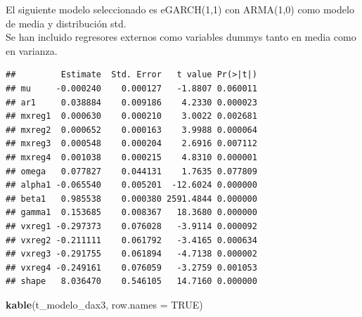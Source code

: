 \documentclass[
  11pt,
]{article}
\newenvironment{Shaded}{\begin{snugshade}}{\end{snugshade}}
\newcommand{\DataTypeTok}[1]{\textcolor[rgb]{0.13,0.29,0.53}{#1}}
\newcommand{\DecValTok}[1]{\textcolor[rgb]{0.00,0.00,0.81}{#1}}
\newcommand{\KeywordTok}[1]{\textcolor[rgb]{0.13,0.29,0.53}{\textbf{#1}}}
\newcommand{\NormalTok}[1]{#1}
\newcommand{\OperatorTok}[1]{\textcolor[rgb]{0.81,0.36,0.00}{\textbf{#1}}}
\newcommand{\OtherTok}[1]{\textcolor[rgb]{0.56,0.35,0.01}{#1}}
\newcommand{\StringTok}[1]{\textcolor[rgb]{0.31,0.60,0.02}{#1}}
\begin{document}
El siguiente modelo seleccionado es eGARCH(1,1) con ARMA(1,0) como
modelo de media y distribución std.\\
Se han incluido regresores externos como variables dummys tanto en media
como en varianza.

\begin{Shaded}
\end{Shaded}

\begin{verbatim}
##         Estimate  Std. Error   t value Pr(>|t|)
## mu     -0.000240    0.000127   -1.8807 0.060011
## ar1     0.038884    0.009186    4.2330 0.000023
## mxreg1  0.000630    0.000210    3.0022 0.002681
## mxreg2  0.000652    0.000163    3.9988 0.000064
## mxreg3  0.000548    0.000204    2.6916 0.007112
## mxreg4  0.001038    0.000215    4.8310 0.000001
## omega   0.077827    0.044131    1.7635 0.077809
## alpha1 -0.065540    0.005201  -12.6024 0.000000
## beta1   0.985538    0.000380 2591.4844 0.000000
## gamma1  0.153685    0.008367   18.3680 0.000000
## vxreg1 -0.297373    0.076028   -3.9114 0.000092
## vxreg2 -0.211111    0.061792   -3.4165 0.000634
## vxreg3 -0.291755    0.061894   -4.7138 0.000002
## vxreg4 -0.249161    0.076059   -3.2759 0.001053
## shape   8.036470    0.546105   14.7160 0.000000
\end{verbatim}

\begin{Shaded}
\begin{Highlighting}[]
\KeywordTok{kable}\NormalTok{(t_modelo_dax3, }\DataTypeTok{row.names =} \OtherTok{TRUE}\NormalTok{)}
\end{Highlighting}
\end{Shaded}
\end{document}
